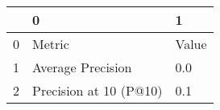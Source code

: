 \begin{tabular}{lll}
\toprule
{} &                       0 &      1 \\
\midrule
0 &                  Metric &  Value \\
1 &       Average Precision &    0.0 \\
2 &  Precision at 10 (P@10) &    0.1 \\
\bottomrule
\end{tabular}
